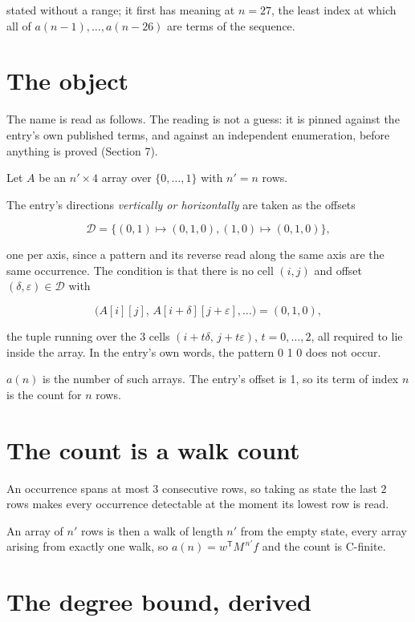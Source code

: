 \documentclass[11pt]{article}
\theoremstyle{definition}
\begin{document}
stated without a range; it first has meaning at $n = 27$, the least index at which all of $a(n-1),\dots,a(n-26)$ are terms of the sequence.

\section{The object}

The name is read as follows. The reading is not a guess: it is pinned against the entry's own published terms, and against an independent enumeration, before anything is proved (Section 7).

Let $A$ be an $n' \times 4$ array over $\{0,\dots,1\}$ with $n' = n$ rows.

The entry's directions {\itshape vertically or horizontally} are taken as the offsets

\[\mathcal{D} = \{(0,1)\mapsto(0,1,0), (1,0)\mapsto(0,1,0)\},\]

one per axis, since a pattern and its reverse read along the same axis are the same occurrence. The condition is that there is no cell $(i,j)$ and offset $(\delta,\varepsilon)\in\mathcal{D}$ with

\[\bigl(A[i][j],\,A[i{+}\delta][j{+}\varepsilon],\dots\bigr) = (0, 1, 0),\]

the tuple running over the $3$ cells $(i+t\delta,\,j+t\varepsilon)$, $t = 0,\dots,2$, all required to lie inside the array. In the entry's own words, the pattern 0 1 0 does not occur.

$a(n)$ is the number of such arrays. The entry's offset is 1, so its term of index $n$ is the count for $n$ rows.

\section{The count is a walk count}

An occurrence spans at most $3$ consecutive rows, so taking as state the last $2$ rows makes every occurrence detectable at the moment its lowest row is read.

An array of $n'$ rows is then a walk of length $n'$ from the empty state, every array arising from exactly one walk, so $a(n) = w^{\mathsf T}M^{\,n'}f$ and the count is C-finite.

\section{The degree bound, derived}
\end{document}
